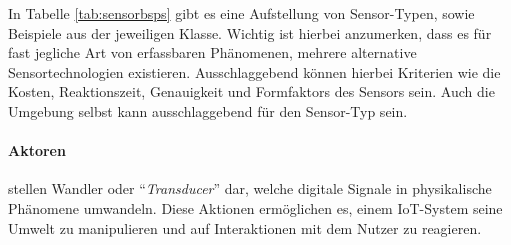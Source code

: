 \begin{table}[h]
\centering
\caption{Sensortypen und beispielhafte Vertreter. Obwohl sämtliche Sensoren analoge bzw. digitale Daten schicken, Sensoren können stark unterschiedliche Outputs besitzen. Tabelle angelehnt an \cite{lopez2011taxonomy}}
\label{tab:sensorbsps}
\end{table}

In Tabelle \ref{tab:sensorbsps} gibt es eine Aufstellung von Sensor-Typen, sowie Beispiele aus der jeweiligen Klasse. Wichtig ist hierbei anzumerken, dass es für fast jegliche Art von erfassbaren Phänomenen, mehrere alternative Sensortechnologien existieren. Ausschlaggebend können hierbei Kriterien wie die Kosten, Reaktionszeit, Genauigkeit und Formfaktors des Sensors sein. Auch die Umgebung selbst kann ausschlaggebend für den Sensor-Typ sein.

\paragraph{Aktoren} stellen Wandler oder "`\textit{Transducer}"' dar, welche digitale Signale in physikalische Phänomene umwandeln. Diese Aktionen ermöglichen es, einem \ac{IoT}-System seine Umwelt zu manipulieren und auf Interaktionen mit dem Nutzer zu reagieren. 

